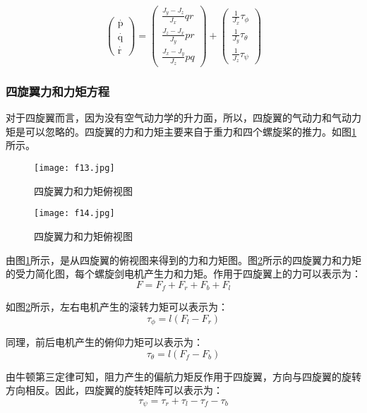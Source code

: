 \begin{equation}
\left( \begin{array}{l}
\mathop p\limits^ \cdot  \\
\mathop q\limits^ \cdot  \\
\mathop r\limits^ \cdot
\end{array} \right) = \left( \begin{array}{l}
\frac{{{J_y} - {J_z}}}{{{J_x}}}qr\\
\frac{{{J_z} - {J_x}}}{{{J_y}}}pr\\
\frac{{{J_x} - {J_y}}}{{{J_z}}}pq
\end{array} \right) + \left( \begin{array}{l}
\frac{1}{{{J_x}}}{\tau _\phi }\\
\frac{1}{{{J_y}}}{\tau _\theta }\\
\frac{1}{{{J_z}}}{\tau _\psi }
\end{array} \right)
\end{equation}

\subsubsection{四旋翼力和力矩方程}
对于四旋翼而言，因为没有空气动力学的升力面，所以，四旋翼的气动力和气动力矩是可以忽略的。四旋翼的力和力矩主要来自于重力和四个螺旋桨的推力。如图\ref{fig21}所示。
\vspace{-20pt}
\begin{figure}[!ht]
\centering
\texttt{[image: f13.jpg]}
\caption{四旋翼力和力矩俯视图}
\label{fig21}
\end{figure}

\begin{figure}[!ht]
\centering
\texttt{[image: f14.jpg]}
\caption{四旋翼力和力矩俯视图}
\label{fig22}
\end{figure}
由图\ref{fig21}所示，是从四旋翼的俯视图来得到的力和力矩图。图\ref{fig22}所示的四旋翼力和力矩的受力简化图，每个螺旋剑电机产生力和力矩。作用于四旋翼上的力可以表示为：
\[F = {F_f} + {F_r} + {F_b} + {F_l}\]

如图\ref{fig22}所示，左右电机产生的滚转力矩可以表示为：
\[{\tau _\phi } = l\left( {{F_l} - {F_r}} \right)\]

同理，前后电机产生的俯仰力矩可以表示为：
\[{\tau _\theta } = l\left( {{F_f} - {F_b}} \right)\]

由牛顿第三定律可知，阻力产生的偏航力矩反作用于四旋翼，方向与四旋翼的旋转方向相反。因此，四旋翼的旋转矩阵可以表示为：
\[{\tau _\psi } = {\tau _r} + {\tau _l} - {\tau _f} - {\tau _b}\]

